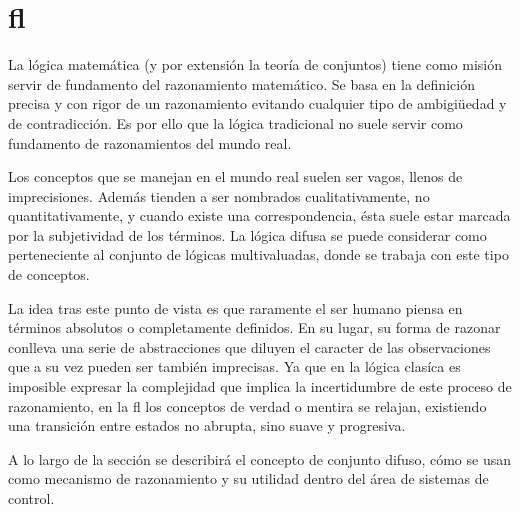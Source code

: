 \section{\gls{fl}}

La lógica matemática (y por extensión la teoría de conjuntos) tiene como misión servir de fundamento del razonamiento matemático. Se basa en la definición precisa y con rigor de un razonamiento evitando cualquier tipo de ambigiüedad y de contradicción. Es por ello que la lógica tradicional no suele servir como fundamento de razonamientos del mundo real.

Los conceptos que se manejan en el mundo real suelen ser vagos, llenos de imprecisiones. Además tienden a ser nombrados cualitativamente, no quantitativamente, y cuando existe una correspondencia, ésta suele estar marcada por la subjetividad de los términos. La lógica difusa se puede considerar como perteneciente al conjunto de lógicas multivaluadas, donde se trabaja con este tipo de conceptos.

La idea tras este punto de vista es que raramente el ser humano piensa en términos absolutos o completamente definidos. En su lugar, su forma de razonar conlleva una serie de abstracciones que diluyen el caracter de las observaciones que a su vez pueden ser también imprecisas. Ya que en la lógica clasíca es imposible expresar la complejidad que implica la incertidumbre de este proceso de razonamiento, en la \ac{fl} los conceptos de verdad o mentira se relajan, existiendo una transición entre estados no abrupta, sino suave y progresiva.

A lo largo de la sección se describirá el concepto de conjunto difuso, cómo se usan como mecanismo de razonamiento y su utilidad dentro del área de sistemas de control.

